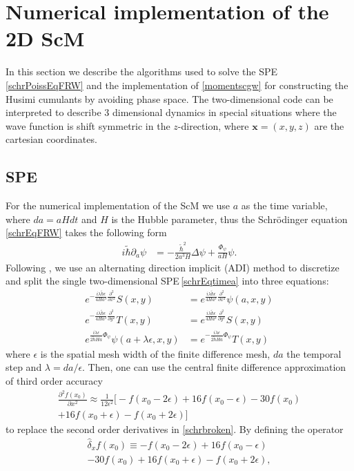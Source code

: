 \documentclass[twocolumn, nofootinbib, showpacs, superscriptaddress]{revtex4-1}
\newcommand{\thbar}{\tilde\hbar}
\newcommand{\del}[0]{\partial }
\newcommand{\vx}[0]{\bm{x} }
\begin{document}
\section{Numerical implementation of the 2D ScM} 
\label{sec:Implementation}
In this section we describe the algorithms used to solve the SPE \eqref{schrPoissEqFRW} and the implementation of  \eqref{momentscgw} 
for constructing the Husimi cumulants by avoiding phase space. 
The two-dimensional code can be interpreted to describe 3 dimensional dynamics in special situations where the wave function is shift symmetric 
in the $z$-direction, where $\vx=(x,y,z)$ are the cartesian coordinates. 
\subsection{SPE}
For the numerical implementation of the ScM we use $a$ as the time variable, where $da = a H dt$ and $H$ is the Hubble parameter, 
thus the Schr\"odinger equation \eqref{schrEqFRW} takes the following form
\begin{align} \label{schrEqtimea}
i\thbar \del_a \psi &= - \frac{\thbar^2}{2a^3H} \Delta \psi + \frac{\varPhi_\psi}{aH} \psi.
\end{align}
Following \cite{PeacemanRachford1955, G95, HarrisonMorozTod2003}, we use an alternating direction implicit (ADI) method to discretize and split the single two-dimensional SPE\,\eqref{schrEqtimea} into three equations: 
\begin{subequations}\label{schrbroken}
\begin{align} 
e^{-\frac{i\lambda\thbar \epsilon}{4Ha^{3}}\frac{\partial^{2}}{\partial x^{2}}}S(x,y) &=e^{\frac{i\lambda\thbar \epsilon}{4Ha^{3}}\frac{\partial^{2}}{\partial x^{2}}} \psi(a,x,y) \\
e^{-\frac{i\lambda\thbar \epsilon}{4Ha^{3}}\frac{\partial^{2}}{\partial y^{2}}}T(x,y) &=e^{\frac{i\lambda\thbar \epsilon}{4Ha^{3}}\frac{\partial^{2}}{\partial y^{2}}} S(x,y) \\
e^{\frac{i\lambda \epsilon}{2\thbar Ha}\varPhi_\psi}\psi(a+\lambda \epsilon,x,y) &= e^{-\frac{i\lambda \epsilon}{2\thbar Ha}\varPhi_\psi} T(x,y)
\end{align}
\end{subequations}
where $\epsilon$ is the spatial mesh width of the finite difference mesh, $da$ the temporal step and $\lambda=da/\epsilon$. Then, one can use the central finite difference approximation of third order accuracy 
\begin{multline} \label{centralfindiff}
\frac{\partial^{2}f(x_{0})}{\partial x^{2}} \approx  \frac{1}{12\epsilon^{2}} 
 \Big[ -f(x_{0}-2\epsilon) +16f(x_{0}-\epsilon) -30f(x_{0}) \\
+16f(x_{0}+\epsilon) -f(x_{0}+2\epsilon)\Big]
\end{multline}
to replace the second order derivatives in \eqref{schrbroken}. By defining the operator 
\begin{multline} \label{centralfindiffoperator}
\hat{\delta}_{x}f(x_{0})\equiv -f(x_{0}-2\epsilon) +16f(x_{0}-\epsilon) \\
 -30f(x_{0}) +16f(x_{0}+\epsilon) -f(x_{0}+2\epsilon),
\end{multline}
\end{document}
